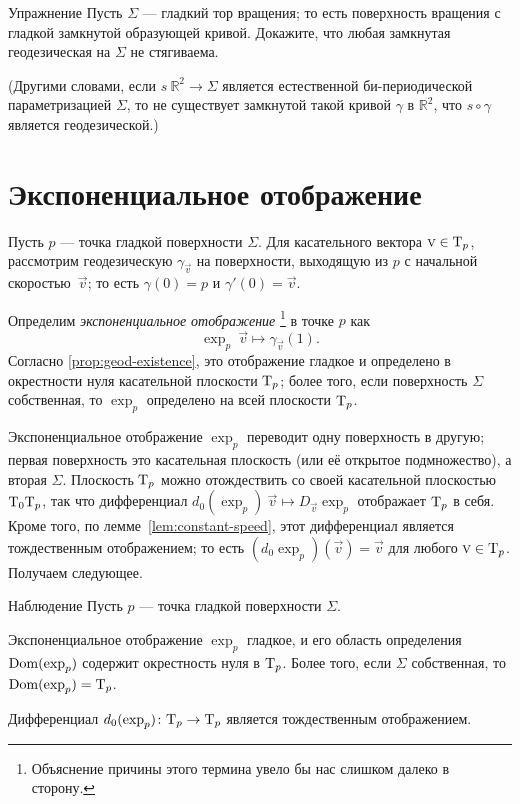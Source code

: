 \begin{thm}{Упражнение}\label{ex:round-torus}
Пусть $\Sigma$ --- гладкий тор вращения; то есть поверхность вращения с гладкой замкнутой образующей кривой.
Докажите, что любая замкнутая геодезическая на $\Sigma$ не стягиваема.

(Другими словами, если $s\:\mathbb{R}^2\to \Sigma$ является естественной би-периодической параметризацией $\Sigma$, то
не существует замкнутой такой кривой $\gamma$ в $\mathbb{R}^2$, что $s\circ\gamma$ является геодезической.)
\end{thm}


\section{Экспоненциальное отображение}\label{sec:exp}

Пусть $p$ --- точка гладкой поверхности $\Sigma$.
Для касательного вектора ${\text{\sc{v}}}\in \mathrm{T}_p$, рассмотрим геодезическую $\gamma_{\vec v}$ на поверхности, выходящую из $p$ с начальной скоростью~$\vec v$;
то есть $\gamma(0)=p$ и $\gamma'(0)={\vec v}$.

Определим \emph{экспоненциальное отображение}%
\footnote{Объяснение причины этого термина увело бы нас слишком далеко в сторону.}
в точке $p$ как
\[\exp_p\:\vec v\mapsto \gamma_{\vec v}(1).\]
Согласно \ref{prop:geod-existence}, это отображение гладкое и определено в окрестности нуля касательной плоскости $\mathrm{T}_p$;
более того, если поверхность $\Sigma$ собственная, 
то $\exp_p$ определено на всей плоскости $\mathrm{T}_p$.

Экспоненциальное отображение $\exp_p$ переводит одну поверхность в другую;
первая поверхность это касательная плоскость (или её открытое подмножество), а вторая $\Sigma$.
Плоскость $\mathrm{T}_p$ можно отождествить 
со своей касательной плоскостью $\mathrm{T}_0\mathrm{T}_p$, так что дифференциал $d_0(\exp_p)\:\vec v\mapsto D_{\vec v}\exp_p$ отображает $\mathrm{T}_p$ в себя.
Кроме того, по лемме~\ref{lem:constant-speed}, этот дифференциал является тождественным отображением; то есть $(d_0\exp_p)(\vec v)=
\vec v$ для любого $\text{\sc{v}}\in \mathrm{T}_p$.
Получаем следующее.

\begin{thm}{Наблюдение}\label{obs:d(exp)=1}
Пусть $p$ --- точка гладкой поверхности $\Sigma$.

{\sloppy

\begin{subthm}{}
Экспоненциальное отображение $\exp_p$ гладкое, и его область определения $\mathop{\rm Dom}\nolimits(\exp_p)$ содержит окрестность нуля в $\mathrm{T}_p$.
Более того, если $\Sigma$ собственная, то $\mathop{\rm Dom}\nolimits(\exp_p)=\mathrm{T}_p$.
\end{subthm}

}

\begin{subthm}{}
Дифференциал $d_0(\exp_p)\colon\mathrm{T}_p\to \mathrm{T}_p$ является тождественным отображением.
\end{subthm}

\end{thm}


